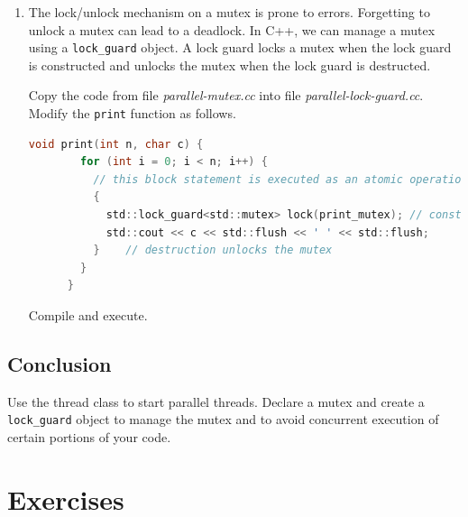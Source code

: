 \documentclass[12pt]{book}
\begin{document}
  \begin{enumerate}[resume*]
  \item The lock/unlock mechanism on a mutex is prone to errors. Forgetting to unlock a mutex can lead to a deadlock. In C++, we can manage a mutex using a \lstinline$lock_guard$ object. A lock guard locks a mutex when the lock guard is constructed and unlocks the mutex when the lock guard is destructed.

    Copy the code from file \emph{parallel-mutex.cc} into file \emph{parallel-lock-guard.cc}. Modify the \verb$print$ function as follows.

    \begin{lstlisting}[language=c]
      void print(int n, char c) {
        for (int i = 0; i < n; i++) {
          // this block statement is executed as an atomic operation;
          {
            std::lock_guard<std::mutex> lock(print_mutex); // construction locks the mutex
            std::cout << c << std::flush << ' ' << std::flush;
          }    // destruction unlocks the mutex 
        }
      }
    \end{lstlisting}

    Compile and execute.
  \end{enumerate}

  \subsection{Conclusion}

  Use the thread class to start parallel threads. Declare a mutex and create a \verb$lock_guard$ object to manage the mutex and to avoid concurrent execution of certain portions of your code.


  \section{Exercises}
\end{document}

